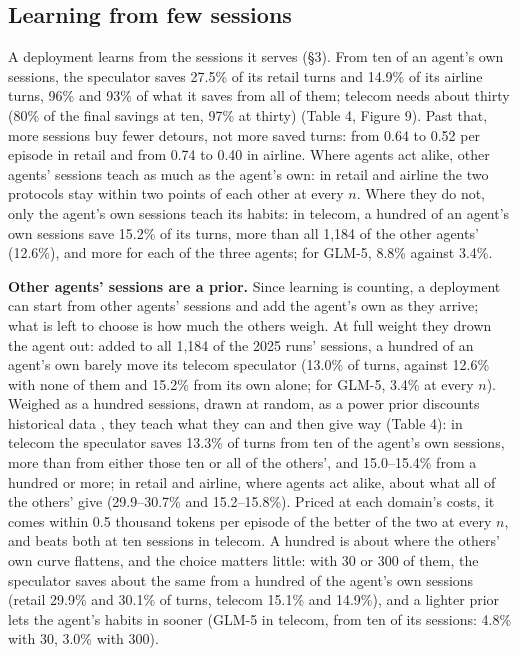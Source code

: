\documentclass[10pt,twocolumn,letterpaper]{article}
\newcommand{\runin}[1]{{\sffamily\bfseries\color{accent}#1}}
\begin{document}
\hypertarget{learning-from-few-sessions}{%
\subsection{Learning from few sessions}\label{learning-from-few-sessions}}

A deployment learns from the sessions it serves (§3). From ten of an agent's own sessions, the speculator saves 27.5\% of its retail turns and 14.9\% of its airline turns, 96\% and 93\% of what it saves from all of them; telecom needs about thirty (80\% of the final savings at ten, 97\% at thirty) (Table 4, Figure 9). Past that, more sessions buy fewer detours, not more saved turns: from 0.64 to 0.52 per episode in retail and from 0.74 to 0.40 in airline. Where agents act alike, other agents' sessions teach as much as the agent's own: in retail and airline the two protocols stay within two points of each other at every \(n\). Where they do not, only the agent's own sessions teach its habits: in telecom, a hundred of an agent's own sessions save 15.2\% of its turns, more than all 1,184 of the other agents' (12.6\%), and more for each of the three agents; for GLM-5, 8.8\% against 3.4\%.

\runin{Other agents' sessions are a prior.} Since learning is counting, a deployment can start from other agents' sessions and add the agent's own as they arrive; what is left to choose is how much the others weigh. At full weight they drown the agent out: added to all 1,184 of the 2025 runs' sessions, a hundred of an agent's own barely move its telecom speculator (13.0\% of turns, against 12.6\% with none of them and 15.2\% from its own alone; for GLM-5, 3.4\% at every \(n\)). Weighed as a hundred sessions, drawn at random, as a power prior discounts historical data \citep{ibrahim2000power}, they teach what they can and then give way (Table 4): in telecom the speculator saves 13.3\% of turns from ten of the agent's own sessions, more than from either those ten or all of the others', and 15.0--15.4\% from a hundred or more; in retail and airline, where agents act alike, about what all of the others' give (29.9--30.7\% and 15.2--15.8\%). Priced at each domain's costs, it comes within 0.5 thousand tokens per episode of the better of the two at every \(n\), and beats both at ten sessions in telecom. A hundred is about where the others' own curve flattens, and the choice matters little: with 30 or 300 of them, the speculator saves about the same from a hundred of the agent's own sessions (retail 29.9\% and 30.1\% of turns, telecom 15.1\% and 14.9\%), and a lighter prior lets the agent's habits in sooner (GLM-5 in telecom, from ten of its sessions: 4.8\% with 30, 3.0\% with 300).
\end{document}
